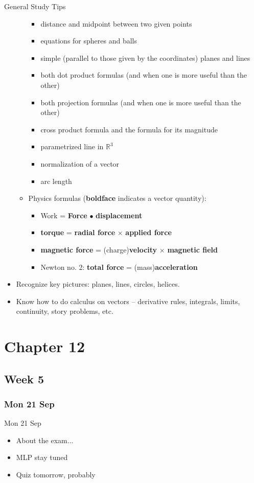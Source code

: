\documentclass[12pt]{beamer}
\theoremstyle{plain}
\theoremstyle{definition}
\begin{document}
\begin{frame}[allowframebreaks]{\small General Study Tips}
\begin{itemize}
\begin{itemize}
		\begin{itemize}
		\item distance and midpoint between two given points
		\item equations for spheres and balls
		\item simple (parallel to those given by the coordinates) planes and lines
		\item both dot product formulas (and when one is more useful than the other)
		\item both projection formulas (and when one is more useful than the other)
\framebreak
		\item cross product formula and the formula for its magnitude
		\item parametrized line in $\mathbb R^3$
		\item normalization of a vector
		\item arc length
		\end{itemize}
	\item Physics formulas ({\bf boldface} indicates a vector quantity):
		\begin{itemize}
		\item Work = {\bf Force} $\bullet$ {\bf displacement}
		\item {\bf torque} = {\bf radial force} $\times$ {\bf applied force}
		\item {\bf magnetic force} = (charge){\bf velocity} $\times$ {\bf magnetic field}
		\item Newton no. 2: {\bf total force} = (mass){\bf acceleration}
		\end{itemize}
	\end{itemize}
\framebreak	
\item Recognize key pictures: planes, lines, circles, helices.	
\item Know how to do calculus on vectors -- derivative rules, integrals, limits, continuity, story problems, etc.
\end{itemize}
\end{frame}

\section{Chapter 12}
\subsection{Week 5}
\subsubsection{Mon 21 Sep}
\begin{frame}{Mon 21 Sep}%
\begin{itemize}
\item About the exam...
\item MLP stay tuned
\item Quiz tomorrow, probably
\end{itemize}
\end{frame}
\end{document}
